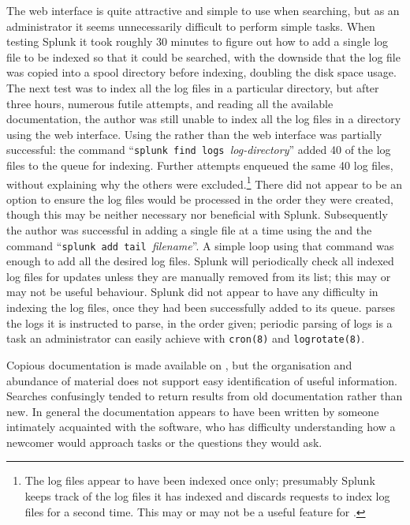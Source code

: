 The web interface is quite attractive and simple to use when searching, but
as an administrator it seems unnecessarily difficult to perform simple
tasks.  When testing Splunk it took roughly 30 minutes to figure out how to
add a single log file to be indexed so that it could be searched, with the
downside that the log file was copied into a spool directory before
indexing, doubling the disk space usage.  The next test was to index all
the log files in a particular directory, but after three hours, numerous
futile attempts, and reading all the available documentation, the author
was still unable to index all the log files in a directory using the web
interface.  Using the  rather than the web interface was
partially successful: the command ``\texttt{splunk find logs
}\textit{log-directory\/}'' added 40 of the \numberOFlogFILES{} log files
to the queue for indexing.  Further attempts enqueued the same 40 log
files, without explaining why the others were excluded.\footnote{The log
files appear to have been indexed once only; presumably Splunk keeps track
of the log files it has indexed and discards requests to index log files
for a second time.  This may or may not be a useful feature for
\parsername{}.} There did not appear to be an option to ensure the log
files would be processed in the order they were created, though this may be
neither necessary nor beneficial with Splunk.  Subsequently the author was
successful in adding a single file at a time using the  and
the command ``\texttt{splunk add tail }\textit{filename\/}''.  A simple
loop using that command was enough to add all the desired log files.
Splunk will periodically check all indexed log files for updates unless
they are manually removed from its list; this may or may not be useful
behaviour.  Splunk did not appear to have any difficulty in indexing the
log files, once they had been successfully added to its queue.
\parsername{} parses the logs it is instructed to parse, in the order
given; periodic parsing of logs is a task an administrator can easily
achieve with \texttt{cron(8)} and \texttt{logrotate(8)}.

Copious documentation is made available on
, but the organisation
and abundance of material does not support easy identification of useful
information.  Searches confusingly tended to return results from old
documentation rather than new.  In general the documentation appears to
have been written by someone intimately acquainted with the software, who
has difficulty understanding how a newcomer would approach tasks or the
questions they would ask.

